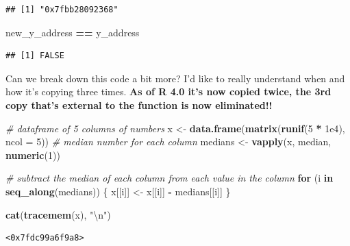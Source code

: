 \documentclass[]{book}
\newenvironment{Shaded}{\begin{snugshade}}{\end{snugshade}}
\newcommand{\CharTok}[1]{\textcolor[rgb]{0.31,0.60,0.02}{#1}}
\newcommand{\CommentTok}[1]{\textcolor[rgb]{0.56,0.35,0.01}{\textit{#1}}}
\newcommand{\ControlFlowTok}[1]{\textcolor[rgb]{0.13,0.29,0.53}{\textbf{#1}}}
\newcommand{\DataTypeTok}[1]{\textcolor[rgb]{0.13,0.29,0.53}{#1}}
\newcommand{\DecValTok}[1]{\textcolor[rgb]{0.00,0.00,0.81}{#1}}
\newcommand{\FloatTok}[1]{\textcolor[rgb]{0.00,0.00,0.81}{#1}}
\newcommand{\KeywordTok}[1]{\textcolor[rgb]{0.13,0.29,0.53}{\textbf{#1}}}
\newcommand{\NormalTok}[1]{#1}
\newcommand{\OperatorTok}[1]{\textcolor[rgb]{0.81,0.36,0.00}{\textbf{#1}}}
\newcommand{\StringTok}[1]{\textcolor[rgb]{0.31,0.60,0.02}{#1}}
\begin{document}
\begin{verbatim}
## [1] "0x7fbb28092368"
\end{verbatim}

\begin{Shaded}
\begin{Highlighting}[]
\NormalTok{new_y_address }\OperatorTok{==}\StringTok{ }\NormalTok{y_address}
\end{Highlighting}
\end{Shaded}

\begin{verbatim}
## [1] FALSE
\end{verbatim}

Can we break down this code a bit more? I'd like to really understand when and how it's copying three times. \textbf{As of R 4.0 it's now copied twice, the 3rd copy that's external to the function is now eliminated!!}

\begin{Shaded}
\begin{Highlighting}[]
\CommentTok{# dataframe of 5 columns of numbers}
\NormalTok{x <-}\StringTok{ }\KeywordTok{data.frame}\NormalTok{(}\KeywordTok{matrix}\NormalTok{(}\KeywordTok{runif}\NormalTok{(}\DecValTok{5} \OperatorTok{*}\StringTok{ }\FloatTok{1e4}\NormalTok{), }\DataTypeTok{ncol =} \DecValTok{5}\NormalTok{))}
\CommentTok{# median number for each column}
\NormalTok{medians <-}\StringTok{ }\KeywordTok{vapply}\NormalTok{(x, median, }\KeywordTok{numeric}\NormalTok{(}\DecValTok{1}\NormalTok{))}

\CommentTok{# subtract the median of each column from each value in the column}
\ControlFlowTok{for}\NormalTok{ (i }\ControlFlowTok{in} \KeywordTok{seq_along}\NormalTok{(medians)) \{}
\NormalTok{  x[[i]] <-}\StringTok{ }\NormalTok{x[[i]] }\OperatorTok{-}\StringTok{ }\NormalTok{medians[[i]]}
\NormalTok{\}}
\end{Highlighting}
\end{Shaded}

\begin{Shaded}
\begin{Highlighting}[]
\KeywordTok{cat}\NormalTok{(}\KeywordTok{tracemem}\NormalTok{(x), }\StringTok{"}\CharTok{\textbackslash{}n}\StringTok{"}\NormalTok{)}
\end{Highlighting}
\end{Shaded}

\begin{verbatim}
<0x7fdc99a6f9a8> 
\end{verbatim}
\end{document}
